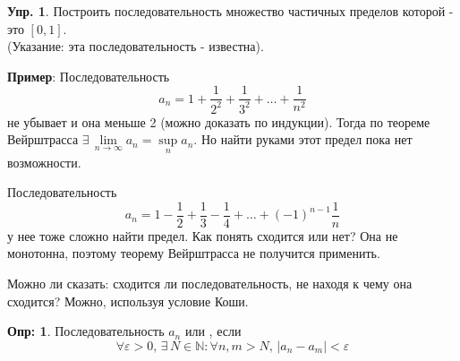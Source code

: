 \documentclass[12pt]{article}
\theoremstyle{definition}
\newtheorem{defn}{Опр:}
\newtheorem{exrc}{Упр.}
\begin{document}
\begin{exrc}
	Построить последовательность множество частичных пределов которой - это $[0,1]$.\\ 
	(Указание: эта последовательность - известна).
\end{exrc}

\textbf{Пример}: Последовательность 
$$a_n = 1 + \frac{1}{2^2} + \frac{1}{3^2} + \dotsc + \frac{1}{n^2}$$ не убывает и она меньше 2 (можно доказать по индукции). Тогда по теореме Вейрштрасса $\exists \, \lim\limits_{n\to \infty} a_n = \sup\limits_{n} a_n$. Но найти руками этот предел пока нет возможности.

Последовательность
$$a_n = 1 - \frac{1}{2} + \frac{1}{3} - \frac{1}{4} + \dotsc + (-1)^{n-1}\frac{1}{n}$$ у нее тоже сложно найти предел. Как понять сходится или нет? Она не монотонна, поэтому теорему Вейрштрасса не получится применить.

Можно ли сказать: сходится ли последовательность, не находя к чему она сходится? Можно, используя условие Коши.

\begin{defn}
	Последовательность $a_n$  или , если $$\forall \varepsilon > 0,\, \exists \, N \in \mathbb{N} \colon \forall n, m > N, \, |a_n - a_m| < \varepsilon$$
\end{defn}
\end{document}
